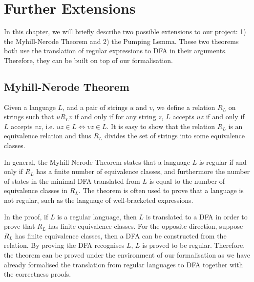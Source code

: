 \chapter{Further Extensions}
\par In this chapter, we will briefly describe two possible extensions to
our project: 1) the Myhill-Nerode Theorem and 2) the Pumping Lemma. These two
theorems both use the translation of regular expressions to DFA
in their arguments. Therefore, they can be built on top of our
formalisation. 


\section{Myhill-Nerode Theorem}
\par Given a language \(L\), and a pair of
strings \(u\) and \(v\), we define a relation \(R_L\) on strings such
that \(u R_L v\) if and only if for any string \(z\), \(L\) accepts
\(uz\) if and only if \(L\) accepts \(vz\), i.e. \(uz \in L
\Leftrightarrow vz \in L\). It is easy to show that the relation \(R_L\) is an equivalence
relation and thus \(R_L\) divides the set of strings into some equivalence
classes. 
\par In general, the Myhill-Nerode Theorem states that a language
\(L\) is regular if and only if \(R_L\) has a finite number of
equivalence classes, and furthermore the number of states in the
minimal DFA translated from \(L\) is equal to the number of
equivalence classes in \(R_L\). The theorem is often used to prove
that a language is not regular, such as the language of well-bracketed
expressions. 

\par In the proof, if \(L\) is a regular language, then \(L\) is
translated to a DFA in order to prove that \(R_L\) has finite equivalence classes. For the opposite direction, suppose \(R_L\)
has finite equivalence classes, then a DFA can be constructed from
the relation. By proving the DFA recognises \(L\), \(L\) is proved to
be regular. Therefore, the theorem can
be proved under the environment of our formalisation as we have
already formalised the translation from regular languages to DFA
together with the correctness proofs. 


